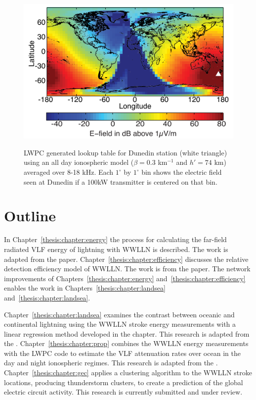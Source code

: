 \begin{figure}[ht!]
	\centering
	\includegraphics[scale=1]{energy/Figures/PPS_Lookup.pdf}\\
	\caption{LWPC generated lookup table for Dunedin station (white triangle) using an all day ionospheric model ($	\beta=0.3$ km$^{-1}$ and $h'=74$ km) averaged over 8-18 kHz. Each $1^{\circ}$ by $1^{\circ}$ bin shows the electric field seen at Dunedin if a 100kW transmitter is centered on that bin.}
	\label{intro:fig:lookup}
\end{figure}

\section{Outline}

In Chapter~\ref{thesis:chapter:energy} the process for calculating the far-field radiated VLF energy of lightning with WWLLN is described.
The work is adapted from the \citet{Hutchins2012} paper.
Chapter~\ref{thesis:chapter:efficiency} discusses the relative detection efficiency model of WWLLN.
The work is from the \citet{Hutchins2012a} paper.
The network improvements of Chapters~\ref{thesis:chapter:energy} and~\ref{thesis:chapter:efficiency} enables the work in Chapters~\ref{thesis:chapter:landsea} and~\ref{thesis:chapter:landsea}.

Chapter~\ref{thesis:chapter:landsea} examines the contrast between oceanic and continental lightning using the WWLLN stroke energy measurements with a linear regression method developed in the chapter.
This research is adapted from the \citet{Hutchins2013}.
Chapter~\ref{thesis:chapter:prop} combines the WWLLN energy measurements with the LWPC code to estimate the VLF attenuation rates over ocean in the day and night ionospheric regimes.
This research is adapted from the \citet{Hutchins2013a}.
Chapter~\ref{thesis:chapter:gec} applies a clustering algorithm to the WWLLN stroke locations, producing thunderstorm clusters, to create a prediction of the global electric circuit activity.
This research is currently submitted and under review.

